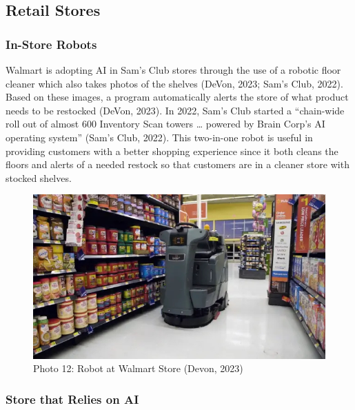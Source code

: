 \documentclass[
]{article}
\begin{document}
\hypertarget{retail-stores}{%
\subsection{Retail Stores}\label{retail-stores}}

\hypertarget{in-store-robots}{%
\subsubsection{In-Store Robots}\label{in-store-robots}}

Walmart is adopting AI in Sam's Club stores through the use of a robotic floor cleaner which also takes photos of the shelves (DeVon, 2023; Sam's Club, 2022). Based on these images, a program automatically alerts the store of what product needs to be restocked (DeVon, 2023). In 2022, Sam's Club started a ``chain-wide roll out of almost 600 Inventory Scan towers \ldots{} powered by Brain Corp's AI operating system'' (Sam's Club, 2022). This two-in-one robot is useful in providing customers with a better shopping experience since it both cleans the floors and alerts of a needed restock so that customers are in a cleaner store with stocked shelves.

\begin{figure}
\centering
\includegraphics{Walmart_Brain_Corp_Robot.jpg}
\caption{Photo 12: Robot at Walmart Store (Devon, 2023)}
\end{figure}

\hypertarget{store-that-relies-on-ai}{%
\subsubsection{Store that Relies on AI}\label{store-that-relies-on-ai}}
\end{document}
